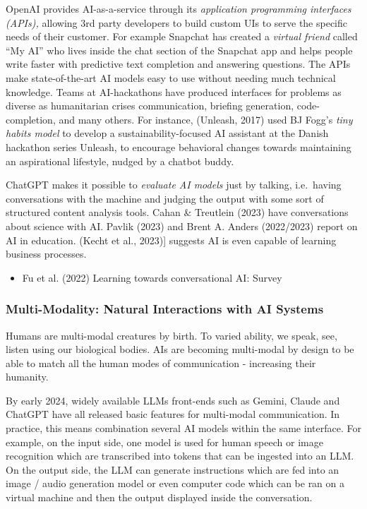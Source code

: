 \documentclass[
  letterpaper,
  DIV=11,
  numbers=noendperiod]{scrartcl}
\providecommand{\tightlist}{%
  \setlength{\itemsep}{0pt}\setlength{\parskip}{0pt}}\usepackage{longtable,booktabs,array}
\begin{document}
OpenAI provides AI-as-a-service through its \emph{application
programming interfaces (APIs),} allowing 3rd party developers to build
custom UIs to serve the specific needs of their customer. For example
Snapchat has created a \emph{virtual friend} called ``My AI'' who lives
inside the chat section of the Snapchat app and helps people write
faster with predictive text completion and answering questions. The APIs
make state-of-the-art AI models easy to use without needing much
technical knowledge. Teams at AI-hackathons have produced interfaces for
problems as diverse as humanitarian crises communication, briefing
generation, code-completion, and many others. For instance, (Unleash,
2017) used BJ Fogg's \emph{tiny habits model} to develop a
sustainability-focused AI assistant at the Danish hackathon series
Unleash, to encourage behavioral changes towards maintaining an
aspirational lifestyle, nudged by a chatbot buddy.

ChatGPT makes it possible to \emph{evaluate AI models} just by talking,
i.e.~having conversations with the machine and judging the output with
some sort of structured content analysis tools. Cahan \& Treutlein
(2023) have conversations about science with AI. Pavlik (2023) and Brent
A. Anders (2022/2023) report on AI in education. (Kecht et al., 2023){]}
suggests AI is even capable of learning business processes.

\begin{itemize}
\tightlist
\item
  Fu et al. (2022) Learning towards conversational AI: Survey
\end{itemize}

\subsubsection{\texorpdfstring{Multi-Modality: \textbf{Natural}
\textbf{Interactions with} AI
Systems}{Multi-Modality: Natural Interactions with AI Systems}}\label{multi-modality-natural-interactions-with-ai-systems}

Humans are multi-modal creatures by birth. To varied ability, we speak,
see, listen using our biological bodies. AIs are becoming multi-modal by
design to be able to match all the human modes of communication -
increasing their humanity.

By early 2024, widely available LLMs front-ends such as Gemini, Claude
and ChatGPT have all released basic features for multi-modal
communication. In practice, this means combination several AI models
within the same interface. For example, on the input side, one model is
used for human speech or image recognition which are transcribed into
tokens that can be ingested into an LLM. On the output side, the LLM can
generate instructions which are fed into an image / audio generation
model or even computer code which can be ran on a virtual machine and
then the output displayed inside the conversation.
\end{document}
